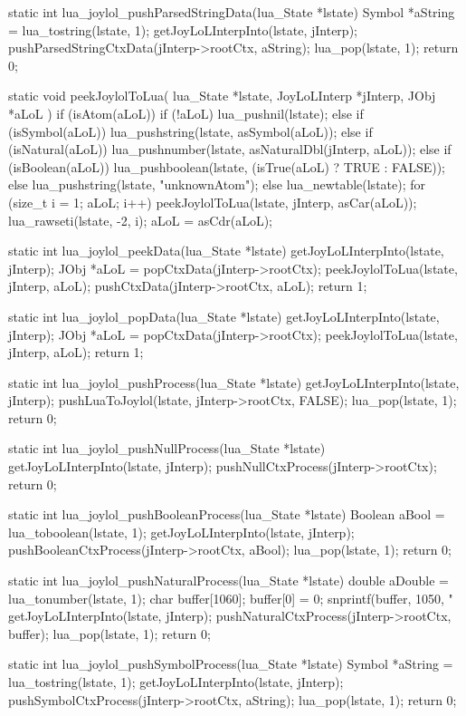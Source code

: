 static int lua_joylol_pushParsedStringData(lua_State *lstate) {
  Symbol *aString = lua_tostring(lstate, 1);
  getJoyLoLInterpInto(lstate, jInterp);
  pushParsedStringCtxData(jInterp->rootCtx, aString);
  lua_pop(lstate, 1);
  return 0;
}

static void peekJoylolToLua(
  lua_State    *lstate,
  JoyLoLInterp *jInterp,
  JObj         *aLoL
) {
  if (isAtom(aLoL)) {
    if (!aLoL) {
      lua_pushnil(lstate);
    } else if (isSymbol(aLoL)) {
      lua_pushstring(lstate, asSymbol(aLoL));
    } else if (isNatural(aLoL)) {
      lua_pushnumber(lstate, asNaturalDbl(jInterp, aLoL));
    } else if (isBoolean(aLoL)) {
      lua_pushboolean(lstate, (isTrue(aLoL) ? TRUE : FALSE));
    } else {
      lua_pushstring(lstate, "unknownAtom");
    }
  } else {
    lua_newtable(lstate);
    for (size_t i = 1; aLoL; i++) {
      peekJoylolToLua(lstate, jInterp, asCar(aLoL));
      lua_rawseti(lstate, -2, i);
      aLoL = asCdr(aLoL);
    }
  }
}

static int lua_joylol_peekData(lua_State *lstate) {
  getJoyLoLInterpInto(lstate, jInterp);
  JObj *aLoL = popCtxData(jInterp->rootCtx);
  peekJoylolToLua(lstate, jInterp, aLoL);
  pushCtxData(jInterp->rootCtx, aLoL);
  return 1;
}

static int lua_joylol_popData(lua_State *lstate) {
  getJoyLoLInterpInto(lstate, jInterp);
  JObj *aLoL = popCtxData(jInterp->rootCtx);
  peekJoylolToLua(lstate, jInterp, aLoL);
  return 1;
}

static int lua_joylol_pushProcess(lua_State *lstate) {
  getJoyLoLInterpInto(lstate, jInterp);
  pushLuaToJoylol(lstate, jInterp->rootCtx, FALSE);
  lua_pop(lstate, 1);
  return 0;
}

static int lua_joylol_pushNullProcess(lua_State *lstate) {
  getJoyLoLInterpInto(lstate, jInterp);
  pushNullCtxProcess(jInterp->rootCtx);
  return 0;
}

static int lua_joylol_pushBooleanProcess(lua_State *lstate) {
  Boolean aBool = lua_toboolean(lstate, 1);
  getJoyLoLInterpInto(lstate, jInterp);
  pushBooleanCtxProcess(jInterp->rootCtx, aBool);
  lua_pop(lstate, 1);
  return 0;
}

static int lua_joylol_pushNaturalProcess(lua_State *lstate) {
  double aDouble = lua_tonumber(lstate, 1);
  char buffer[1060];
  buffer[0] = 0;
  snprintf(buffer, 1050, "%
  getJoyLoLInterpInto(lstate, jInterp);
  pushNaturalCtxProcess(jInterp->rootCtx, buffer);
  lua_pop(lstate, 1);
  return 0;
}

static int lua_joylol_pushSymbolProcess(lua_State *lstate) {
  Symbol *aString = lua_tostring(lstate, 1);
  getJoyLoLInterpInto(lstate, jInterp);
  pushSymbolCtxProcess(jInterp->rootCtx, aString);
  lua_pop(lstate, 1);
  return 0;
}

